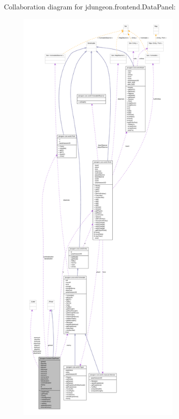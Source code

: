 Collaboration diagram for jdungeon.frontend.DataPanel:
\nopagebreak
\begin{figure}[H]
\begin{center}
\leavevmode
\includegraphics[height=600pt]{classjdungeon_1_1frontend_1_1_data_panel__coll__graph}
\end{center}
\end{figure}
